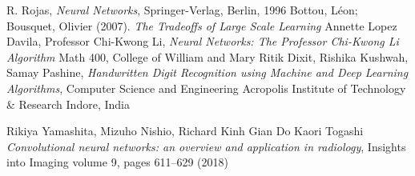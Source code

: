 \documentclass[12pt,a4paper,openright,twoside]{report}
\begin{document}
\begin{thebibliography}{90}             %
\rhead[\fancyplain{}{\bfseries \leftmark}]{\fancyplain{}{\bfseries
\thepage}}
 R. Rojas, \emph{Neural Networks}, Springer-Verlag, Berlin, 1996
 Bottou, Léon; Bousquet, Olivier (2007). \emph{The Tradeoffs of Large Scale Learning}
 Annette Lopez Davila, Professor Chi-Kwong Li, \emph{Neural Networks: The Professor Chi-Kwong Li Algorithm} Math 400, College of William and Mary
 Ritik Dixit, Rishika Kushwah, Samay Pashine, \emph{Handwritten Digit Recognition using Machine and Deep Learning Algorithms}, Computer Science and Engineering
Acropolis Institute of Technology \& Research
Indore, India


Rikiya Yamashita, Mizuho Nishio, Richard Kinh Gian Do Kaori Togashi \emph{Convolutional neural networks: an overview
and application in radiology}, Insights into Imaging volume 9, pages 611–629 (2018)

\end{thebibliography}
\end{document}
